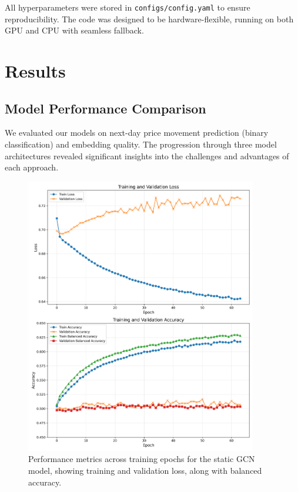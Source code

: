 \documentclass[12pt]{article}
\begin{document}
All hyperparameters were stored in \texttt{configs/config.yaml} to ensure reproducibility. The code was designed to be hardware-flexible, running on both GPU and CPU with seamless fallback.

\section{Results}

\subsection{Model Performance Comparison}

We evaluated our models on next-day price movement prediction (binary classification) and embedding quality. The progression through three model architectures revealed significant insights into the challenges and advantages of each approach.

\begin{figure}[h]
    \centering
    \includegraphics[width=0.9\textwidth]{../models/gcn/plots/expanded_metrics_plot.png}
    \caption{Performance metrics across training epochs for the static GCN model, showing training and validation loss, along with balanced accuracy.}
    \label{fig:static_gcn_metrics}
\end{figure}
\end{document}
